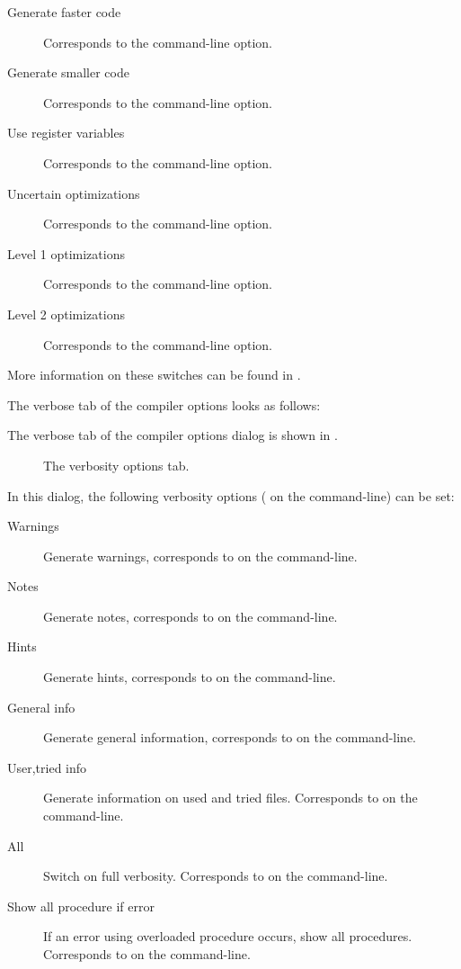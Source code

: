 \begin{description}
\begin{description}
\item[Generate faster code] Corresponds to the  command-line option.
\item[Generate smaller code] Corresponds to the  command-line option.
\item[Use register variables] Corresponds to the  command-line
option.
\item[Uncertain optimizations] Corresponds to the  command-line
option.
\item[Level 1 optimizations] Corresponds to the  command-line
option.
\item[Level 2 optimizations] Corresponds to the  command-line
option.
\end{description}
\end{description}
More information on these switches can be found in .

\begin{htmlonly}
The verbose tab of the compiler options looks as follows:
\end{htmlonly}
\begin{latexonly}
The verbose tab of the compiler options dialog is shown in
.
\begin{figure}[ht]
\begin{center}
\caption{The verbosity options tab.}\label{fig:ocompc}
\ifpdf
{}
\else
{}
\fi
\end{center}
\end{figure}
\end{latexonly}
In this dialog, the following verbosity options ( on the
command-line) can be set:
\begin{description}
\item[Warnings] Generate warnings, corresponds to  on the
command-line.
\item[Notes] Generate notes, corresponds to  on the
command-line.
\item[Hints] Generate hints, corresponds to  on the
command-line.
\item[General info] Generate general information, corresponds to  on the
command-line.
\item[User,tried info] Generate information on used and tried files. Corresponds to  on the
command-line.
\item[All] Switch on full verbosity. Corresponds to  on the
command-line.
\item[Show all procedure if error] If an error using overloaded procedure
occurs, show all procedures. Corresponds to  on the
command-line.
\end{description}

